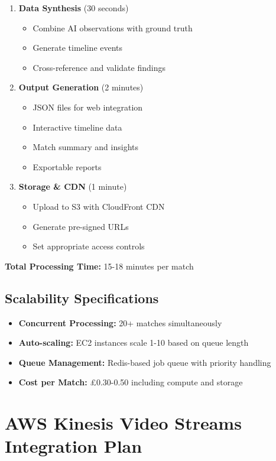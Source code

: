 \documentclass[11pt,a4paper]{article}
\begin{document}
\begin{enumerate}[leftmargin=1.5cm]
    \item \textbf{Data Synthesis} (30 seconds)
    \begin{itemize}
        \item Combine AI observations with ground truth
        \item Generate timeline events
        \item Cross-reference and validate findings
    \end{itemize}
    
    \item \textbf{Output Generation} (2 minutes)
    \begin{itemize}
        \item JSON files for web integration
        \item Interactive timeline data
        \item Match summary and insights
        \item Exportable reports
    \end{itemize}
    
    \item \textbf{Storage \& CDN} (1 minute)
    \begin{itemize}
        \item Upload to S3 with CloudFront CDN
        \item Generate pre-signed URLs
        \item Set appropriate access controls
    \end{itemize}
\end{enumerate}

\textbf{Total Processing Time:} 15-18 minutes per match

\subsection{Scalability Specifications}
\begin{itemize}[leftmargin=1.5cm]
    \item \textbf{Concurrent Processing:} 20+ matches simultaneously
    \item \textbf{Auto-scaling:} EC2 instances scale 1-10 based on queue length
    \item \textbf{Queue Management:} Redis-based job queue with priority handling
    \item \textbf{Cost per Match:} £0.30-0.50 including compute and storage
\end{itemize}

\section{AWS Kinesis Video Streams Integration Plan}
\end{document}
